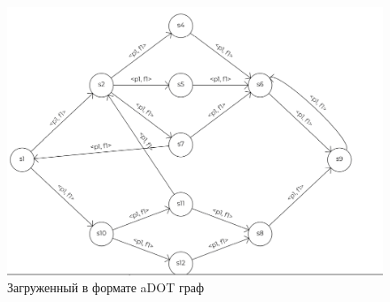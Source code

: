 \chapter{}\label{apx_a6}
\begin{figure}[!h]
\centerline{\includegraphics[scale=0.5]{images/4.png}}
\caption{Загруженный в формате aDOT граф}
\label{g3}
\end{figure}
%
%
%
%
%
%




